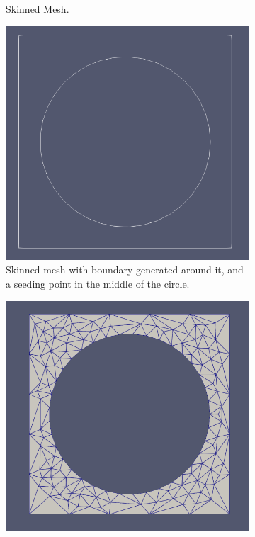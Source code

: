 \documentclass[12pt, letterpaper]{article}
\begin{document}
\begin{figure}
\begin{subfigure}{0.4\textwidth}
	    \caption{Skinned Mesh.}
	\end{subfigure}
	\vspace*{\fill}	
	\begin{subfigure}{0.4\textwidth}
	    \includegraphics[width=\linewidth]{	processExample/bound.png}
	    \caption{Skinned mesh with boundary generated around it, and a seeding point in the middle of the circle.}
	    \label{SeedingPoint}
	\end{subfigure}
	\hspace*{\fill}	
	\begin{subfigure}{0.4\textwidth}
	    \includegraphics[width=\linewidth]{	processExample/vac.png}

\end{subfigure}
\end{figure}
\end{document}
